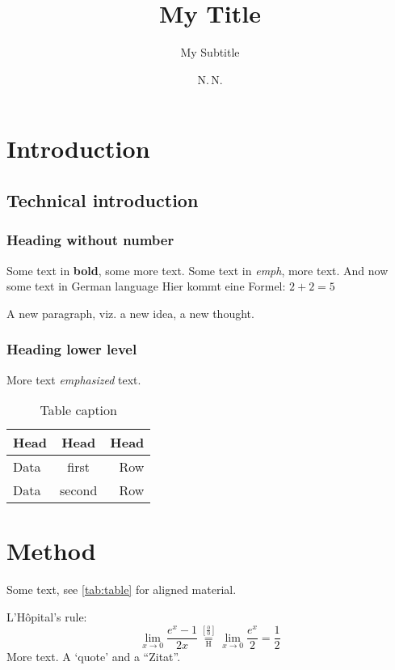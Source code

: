 \documentclass[fontsize=12pt,paper=a4,open=any,parskip=half,
  twoside=false,toc=listof,toc=bibliography,fleqn,leqno,
  captions=nooneline,captions=tableabove,british]{scrbook}
\begin{document}
\frontmatter %
\titlehead{\hfill\texttt{[image: logo]}} 
\title{My Title} \subtitle{My Subtitle} \author{N.\,N.} \date{}
\maketitle 
\tableofcontents \listoffigures \listoftables

\mainmatter %
\chapter[Intro]{Introduction}\label{sec:intro}
\section{Technical introduction}\label{sec:tecintro}
\subsection*{Heading without number}
Some text in \textbf{bold}, some more text. 
Some text in \emph{emph}, more text. 
And now some text in German language
\foreignlanguage{ngerman}{Hier kommt eine Formel:} \(2+2=5\)

A new paragraph, viz. a new idea, a new thought.

\subsection{Heading lower level}\label{sec:headingLL}
More text \emph{emphasized} text.\autocite{WC:2017}
\begin{table}[htp]
\caption{Table caption}\label{tab:table}
  \begin{tabular}{l@{\qquad}cr} \toprule
    Head   & Head & Head \\ \midrule  
    Data   & first  &  Row \\
    Data   & second &  Row \\ \bottomrule
  \end{tabular}
\end{table}

\chapter{Method}\label{sec:ana}
Some text, see \autoref{tab:table} for aligned material.

L'Hôpital's rule:
\begin{equation}
\lim_{x\to 0}{\frac{e^x-1}{2x}} 
\overset{\left[\frac{0}{0}\right]}{\underset{\mathrm{H}}{=}} 
\lim_{x\to 0}{\frac{e^x}{2}}={\frac{1}{2}}
\end{equation}\label{eq:lhopital}
\newpage
More text. A \enquote*{quote} and a \foreignquote{ngerman}{Zitat}.
\end{document}
